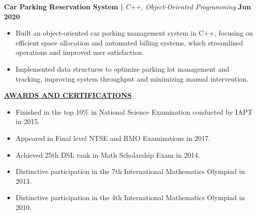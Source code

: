 \documentclass{article}
\begin{document}
\noindent \textbf{Car Parking Reservation System | } \textit{C++, Object-Oriented Programming} \hfill \textbf{Jun 2020}
\begin{itemize}[noitemsep,nolistsep,leftmargin=*]
\item {\small Built an object-oriented car parking management system in C++, focusing on efficient space allocation and automated billing systems, which streamlined operations and improved user satisfaction.}
\item {\small Implemented data structures to optimize parking lot management and tracking, improving system throughput and minimizing manual intervention.}\\
\end{itemize}



\noindent \textbf{\underline{AWARDS AND CERTIFICATIONS}} 
\begin{itemize}[noitemsep,nolistsep,leftmargin=*]
\item {\small Finished in the top 10\% in National Science Examination conducted by IAPT in 2015.}
\item {\small Appeared in Final level NTSE and RMO Examinations in 2017.}
\item {\small Achieved 25th DSL rank in Math Scholarship Exam in 2014.}
\item {\small Distinctive participation in the 7th International Mathematics Olympiad in 2013.}
\item {\small Distinctive participation in the 4th International Mathematics Olympiad in 2010.}
\end{itemize}

\end{document}
